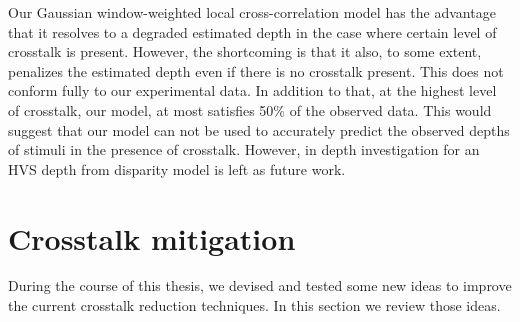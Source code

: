 Our Gaussian window-weighted local cross-correlation model has the advantage that it resolves to a degraded estimated depth in the case where certain level of crosstalk is present. However, the shortcoming is that it also, to some extent, penalizes the estimated depth even if there is no crosstalk present. This does not conform fully to our experimental data.  In addition to that, at the highest level of crosstalk, our model, at most satisfies 50\% of the observed data. This would suggest that our model can not be used to accurately predict the observed depths of stimuli in the presence of crosstalk. However, in depth investigation for an HVS depth from disparity model is left as future work.

\section{Crosstalk mitigation}

During the course of this thesis, we devised and tested some new ideas to improve the current crosstalk reduction techniques. In this section we review those ideas.

